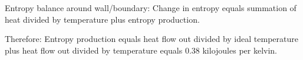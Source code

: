 Entropy balance around wall/boundary:  
Change in entropy equals summation of heat divided by temperature plus entropy production.  

Therefore:  
Entropy production equals heat flow out divided by ideal temperature plus heat flow out divided by temperature equals 0.38 kilojoules per kelvin.